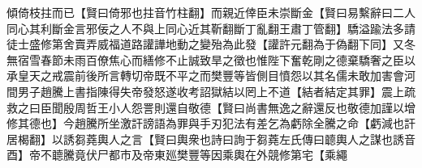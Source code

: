 傾倚枝拄而已【賢曰倚邪也拄音竹柱翻】而親近倖臣未崇斷金【賢曰易繫辭曰二人同心其利斷金言邪佞之人不與上同心近其靳翻斷丁亂翻王肅丁管翻】驕溢踰法多請徒士盛修第舍賣弄威福道路讙譁地動之變殆為此發【讙許元翻為于偽翻下同】又冬無宿雪春節未雨百僚焦心而繕修不止誠致旱之徵也惟陛下奮乾剛之德棄驕奢之臣以承皇天之戒震前後所言轉切帝既不平之而樊豐等皆側目憤怨以其名儒未敢加害會河間男子趙騰上書指陳得失帝發怒遂收考詔獄結以罔上不道【結者結定其罪】震上疏救之曰臣聞殷周哲王小人怨詈則還自敬德【賢曰尚書無逸之辭還反也敬德加謹以增修其德也】今趙騰所坐激訐謗語為罪與手刃犯法有差乞為虧除全騰之命【虧減也訐居楬翻】以誘芻蕘輿人之言【賢曰輿衆也詩曰詢于芻蕘左氏傳曰聼輿人之謀也誘音酉】帝不聼騰竟伏尸都市及帝東廵樊豐等因乘輿在外競修第宅【乘繩